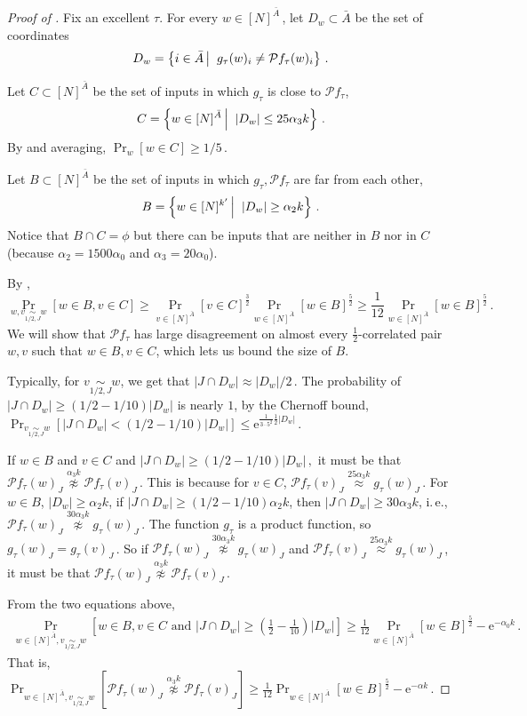 \documentclass[11pt]{article}
\numberwithin{equation}{section}
\theoremstyle{definition}
\theoremstyle{plain}
\newcommand{\eee}{\mathrm e}
\newcommand{\ie}{i.\,e.}
\newcommand{\Prob}[2][]{\Pr_{{#1}}\left[#2\right]} %
\newcommand{\Paren}[1]{\left(#1\right)} %
\newcommand{\abs}[1]{\lvert#1\rvert} %
\newcommand\sett[2]{\left\{ #1 \left| \; \vphantom{#1 #2} \right. #2  \right\}} %
\newcommand\f{f} %
\newcommand{\g}{g} %
\newcommand\bh{\mathcal{P}\f_\tau} %
\newcommand\neql[1]{\stackrel{{#1}}{ \approx}} %
\newcommand\neqg[1]{\stackrel{{#1}}{ \not\approx}} %
\newcommand\cor[1]{\underset{\scriptscriptstyle#1}{\sim}} %
\begin{document}
\begin{proof}[Proof of ]
	Fix an excellent $\tau$.	
	For every $w\in [N]^{\bar{A}}$\,, let $D_w\subset\bar{A}$ be the set of coordinates %
	\[ D_w = \sett{i\in\bar{A}}{\g_\tau(w)_i\neq\bh(w)_i}\,. \] %
	
	Let $C\subset[N]^{\bar{A}}$ be the set of inputs in which $\g_\tau$ is close to $\bh$,
	\[ C = \sett{w\in[N]^{\bar{A}}}{\abs{D_w}\leq 25\alpha_3 k} \,.\]%
	By  and averaging, $\Pr_w[w\in C]\geq 
	1/5$\,.%
	
	Let $B\subset[N]^{\bar{A}}$ be the set of inputs in which $\g_\tau,\bh$ are far from each other,
	\[ B = \sett{w\in[N]^{k'}}{\abs{D_w}\geq \alpha_2 k} \,.\]%
	Notice that $B\cap C=\phi$ but there can be inputs that are neither in $B$ nor in $C$ (because $\alpha_2 = 1500\alpha_0$ and $\alpha_3 = 20\alpha_0$).
	
	By , 
	\[ \Prob[{w,v\cor{1/2,J}{w}}]{w\in B, v\in C}\geq \Pr_{v\in[N]^{\bar{A}}}[v\in C]^\frac{3}{2}\Pr_{w\in[N]^{\bar{A}}}[w\in B]^\frac{5}{2} \geq \frac{1}{12}\Pr_{w\in[N]^{\bar{A}}}[w\in B]^\frac{5}{2}\,. \]%
	We will show that $\bh$ has large disagreement on almost every $\frac{1}{2}$-correlated pair $w,v$ such that $w\in B,v\in C$, which lets us bound the size of $B$. 
	
	Typically, for $v\cor{1/2,J}w$, we get that $\abs{J\cap D_w}\approx 
\abs{D_w}/2$\,. %
 The probability of  $\abs{J\cap D_w}\geq 
	\Paren{1/2-1/10}\abs{D_w}$ %
	is nearly $1$, by
the   %
Chernoff bound, $\Prob[{v\cor{1/2,J}{w}}]{\abs{J\cap D_w}< 
	\Paren{1/2-1/10}\abs{D_w} %
 } \leq \eee^{\frac{1}{3\cdot 5^2}\frac{1}{2}\abs{D_w}}$\,. 
	
	If $w\in B$ and $v\in C$ and  $\abs{J\cap D_w}\geq 
		\Paren{1/2-1/10}\abs{D_w}\,,$ %
	it must be that $\bh(w)_J\neqg{\alpha_3 k} \bh(v)_J$\,. This is because for $v\in C$, $\bh(v)_J\neql{25\alpha_3 k}\g_\tau(w)_J$\,. For $w\in B$, $\abs{D_w}\geq \alpha_2 k$, if $\abs{J\cap D_w}\geq
	 	\Paren{1/2-1/10} %
	 \alpha_2 k$, then $ \abs{J\cap D_w}\geq 30\alpha_3 k$, \ie, $\bh(w)_J\neqg{30\alpha_3 k}\g_\tau(w)_J$\,. The function $\g_\tau$ is a product function, so $\g_\tau(w)_J = \g_\tau(v)_J$\,. So if $\bh(w)_J\neqg{30\alpha_3 k}\g_\tau(w)_J$ and $\bh(v)_J\neql{25\alpha_3 k}\g_\tau(w)_J$\,, it must be that $\bh(w)_J\neqg{\alpha_3 k} \bh(v)_J$\,.
	 
	 From the two equations above,
	\begin{align} \label{eq:lower BC}
		\Prob[{w\in[N]^{\bar{A}},v\cor{1/2,J}w}]{w\in B,v\in C \textrm{ and } \abs{J\cap D_w}\geq \Paren{\frac{1}{2}-\frac{1}{10}}\abs{D_w}} \geq \frac{1}{12}\Pr_{w\in[N]^{\bar{A}}}[w\in B]^\frac{5}{2} - \eee^{-\alpha_0 k}\,.%
	\end{align}
	That is, $\Prob[{w\in[N]^{\bar{A}},v\cor{1/2,J}w}]{\bh(w)_J\neqg{\alpha_3 k} \bh(v)_J}\geq \frac{1}{12}\Pr_{w\in[N]^{\bar{A}}}[w\in B]^\frac{5}{2} - \eee^{-\alpha k}$\,.


\end{proof}
\end{document}
